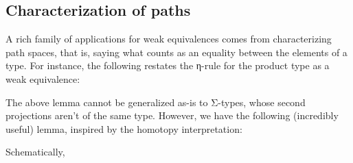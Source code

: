 \documentclass[./thesis.tex]{subfiles}
\begin{document}
\subsection{Characterization of paths}
\label{subsec:characterization-of-paths}

A rich family of applications for weak equivalences comes from characterizing
path spaces, that is, saying what counts as an equality between the elements of
a type. For instance, the following restates the η-rule for the product type as
a weak equivalence:


The above lemma cannot be generalized as-is to Σ-types, whose second projections
aren't of the same type. However, we have the following (incredibly useful)
lemma, inspired by the homotopy interpretation:


Schematically,
\end{document}
